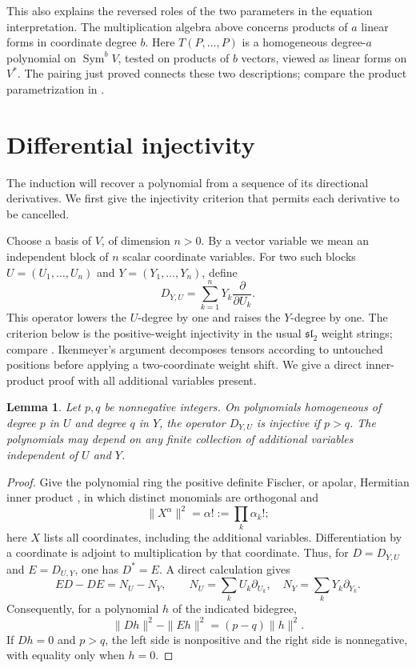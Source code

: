 \documentclass[11pt]{article}
\newtheorem{lemma}[theorem]{Lemma}
\theoremstyle{remark}
\DeclareMathOperator{\Sym}{Sym}
\newcommand{\D}[2]{D_{#1,#2}}
\begin{document}
This also explains the reversed roles of the two parameters in the equation
interpretation. The multiplication algebra above concerns products of $a$
linear forms in coordinate degree $b$. Here $T(P,\ldots,P)$ is a homogeneous
degree-$a$ polynomial on $\Sym^b V$, tested on products of $b$ vectors, viewed as linear
forms on $V^*$. The pairing just proved connects these two descriptions;
compare the product parametrization in \cite[Section~2]{RSW}.

\section{Differential injectivity}\label{sec:differential}

The induction will recover a polynomial from a sequence of its
directional derivatives. We first give the injectivity criterion that
permits each derivative to be cancelled.

Choose a basis of $V$, of dimension $n>0$. By a vector variable we mean an
independent block of $n$ scalar coordinate variables. For two such blocks
$U=(U_1,\ldots,U_n)$ and $Y=(Y_1,\ldots,Y_n)$, define
\[
 \D{Y}{U}=\sum_{k=1}^n Y_k\frac{\partial}{\partial U_k}.
\]
This operator lowers the $U$-degree by one and raises the $Y$-degree by one.
The criterion below is the positive-weight injectivity in the usual
$\mathfrak{sl}_2$ weight strings; compare
\cite[Section~11.1, Claim~11.4 and equation~(11.5)]{FultonHarris}.
Ikenmeyer's argument \cite[Section~5, Claim~5.1]{Ikenmeyer} decomposes
tensors according to untouched positions before applying a two-coordinate
weight shift.
We give a direct inner-product proof with all additional variables present.

\begin{lemma}\label{lem:shift}
Let $p,q$ be nonnegative integers. On polynomials homogeneous of degree $p$
in $U$ and degree $q$ in $Y$, the operator $\D{Y}{U}$ is injective if
$p>q$. The polynomials may depend on any finite collection of additional
variables independent of $U$ and $Y$.
\end{lemma}

\begin{proof}
Give the polynomial ring the positive definite Fischer, or apolar,
Hermitian inner product
\cite[Section~2, equation~(8) and Proposition~3]{AldazRender}, in which
distinct monomials are orthogonal and
\[
 \|X^\alpha\|^2=\alpha!:=\prod_k\alpha_k!;
\]
here $X$ lists all coordinates, including the additional variables.
Differentiation by a coordinate is adjoint to multiplication by that
coordinate. Thus, for $D=\D{Y}{U}$ and $E=\D{U}{Y}$, one has $D^*=E$.
A direct calculation gives
\[
 ED-DE=N_U-N_Y,
 \qquad
 N_U=\sum_k U_k\partial_{U_k},\quad
 N_Y=\sum_k Y_k\partial_{Y_k}.
\]
Consequently, for a polynomial $h$ of the indicated bidegree,
\begin{equation}\label{eq:norm}
 \|Dh\|^2-\|Eh\|^2=(p-q)\|h\|^2.
\end{equation}
If $Dh=0$ and $p>q$, the left side is nonpositive and the right side is
nonnegative, with equality only when $h=0$.
\end{proof}
\end{document}
